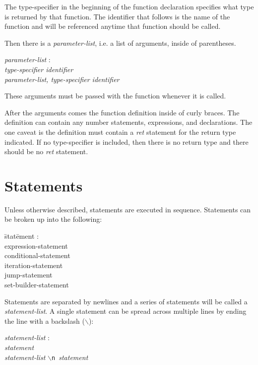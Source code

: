 \documentclass{article}
\begin{document}
The type-specifier in the beginning of the function declaration specifies what type is returned by that function. The identifier that follows is the name of the function and will be referenced anytime that function should be called. 

Then there is a \emph{parameter-list}, i.e. a list of arguments, inside of parentheses.
\begin{tabbing}
	\= \emph{param}\=\emph{eter-list} : \\
		\> \> \emph{type-specifier identifier} \\
		\> \> \emph{parameter-list, type-specifier identifier}
\end{tabbing}
These arguments must be passed with the function whenever it is called.

After the arguments comes the function definition inside of curly braces. The definition can contain any number statements, expressions, and declarations. The one caveat is the definition must contain a \emph{ret} statement for the return type indicated. If no type-specifier is included, then there is no return type and there should be no \emph{ret} statement.

\section{Statements}
Unless otherwise described, statements are executed in sequence. Statements can be broken up into the following:
\begin{itshape}
\begin{tabbing}
	\= stat\=ement : \\
		\> \> expression-statement \\
		\>\> conditional-statement \\
		\> \> iteration-statement \\
		\> \> jump-statement \\
		\> \> set-builder-statement  
\end{tabbing}
\end{itshape}

Statements are separated by newlines and a series of statements will be called a \emph{statement-list}. A single statement can be spread across multiple lines by ending the line with a backslash ($\backslash$):
\begin{tabbing}
	\= \emph{stat}\=\emph{ement-list} : \\
		\> \> \emph{statement} \\
		\> \> \emph{statement-list} \texttt{$\backslash$n }\emph{statement}
\end{tabbing}
\end{document}
